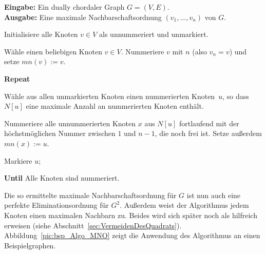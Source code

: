\begin{Algorithm}\label{algo:mno}
    \textbf{Eingabe:} Ein dually chordaler Graph $G=(V,E)$.\\
    \textbf{Ausgabe:} Eine maximale Nachbarschaftsordnung $(v_1,\ldots,v_n)$ von $G$.\\

    \begin{codeLine}
        \item Initialisiere alle Knoten $v \in V$ als unnummeriert und unmarkiert.
        \item Wähle einen beliebigen Knoten $v \in V$. Nummeriere $v$ mit $n$ (also $v_n = v$) und setze $mn(v) := v$.
        \item \textbf{Repeat}
              \begin{innerCodeLine}
                  \item Wähle aus allen unmarkierten Knoten einen nummerierten Knoten~$u$, so dass $N[u]$ eine maximale Anzahl an nummerierten Knoten enthält.
                  \item Nummeriere alle unnummerierten Knoten $x$ aus $N[u]$ fortlaufend mit der höchstmöglichen Nummer zwischen $1$ und $n-1$, die noch frei ist. Setze außerdem $mn(x) := u$.
                  \item Markiere $u$;
              \end{innerCodeLine}
              \textbf{Until} Alle Knoten sind nummeriert.
    \end{codeLine}
\end{Algorithm}

Die so ermittelte maximale Nachbarschaftsordnung für $G$ ist nun auch eine perfekte Eliminationsordnung für $G^2$. Außerdem weist der Algorithmus jedem Knoten einen maximalen Nachbarn zu. Beides wird sich später noch als hilfreich erweisen (siehe Abschnitt~\ref{sec:VermeidenDesQuadrats}). Abbildung~\ref{pic:bsp_Algo_MNO} zeigt die Anwendung des Algorithmus an einen Beispielgraphen.

